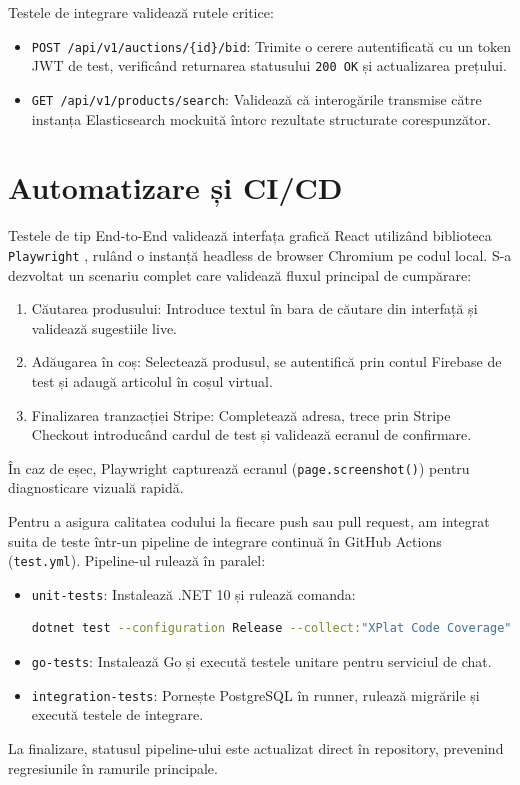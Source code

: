Testele de integrare validează rutele critice:
\begin{itemize}
    \item \texttt{POST /api/v1/auctions/\{id\}/bid}: Trimite o cerere autentificată cu un token JWT de test, verificând returnarea statusului \texttt{200 OK} și actualizarea prețului.
    \item \texttt{GET /api/v1/products/search}: Validează că interogările transmise către instanța Elasticsearch mockuită întorc rezultate structurate corespunzător.
\end{itemize}

\section{Automatizare și CI/CD}

Testele de tip End-to-End validează interfața grafică React utilizând biblioteca \texttt{Playwright} \cite{playwright2026docs}, rulând o instanță headless de browser Chromium pe codul local. S-a dezvoltat un scenariu complet care validează fluxul principal de cumpărare:
\begin{enumerate}
    \item Căutarea produsului: Introduce textul în bara de căutare din interfață și validează sugestiile live.
    \item Adăugarea în coș: Selectează produsul, se autentifică prin contul Firebase de test și adaugă articolul în coșul virtual.
    \item Finalizarea tranzacției Stripe: Completează adresa, trece prin Stripe Checkout introducând cardul de test și validează ecranul de confirmare.
\end{enumerate}

În caz de eșec, Playwright capturează ecranul (\texttt{page.screenshot()}) pentru diagnosticare vizuală rapidă.

Pentru a asigura calitatea codului la fiecare push sau pull request, am integrat suita de teste într-un pipeline de integrare continuă în GitHub Actions (\texttt{test.yml}). Pipeline-ul rulează în paralel:
\begin{itemize}
    \item \texttt{unit-tests}: Instalează .NET 10 și rulează comanda:
    \begin{lstlisting}[language=Bash]
    dotnet test --configuration Release --collect:"XPlat Code Coverage"
    \end{lstlisting}
    \item \texttt{go-tests}: Instalează Go și execută testele unitare pentru serviciul de chat.
    \item \texttt{integration-tests}: Pornește PostgreSQL în runner, rulează migrările și execută testele de integrare.
\end{itemize}
La finalizare, statusul pipeline-ului este actualizat direct în repository, prevenind regresiunile în ramurile principale.
